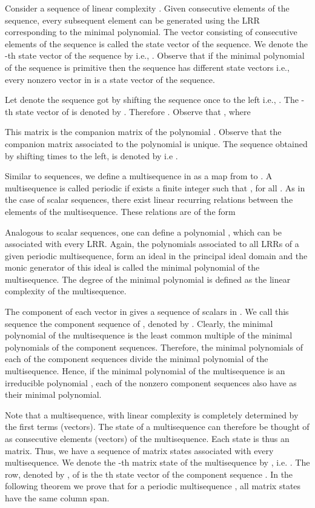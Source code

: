 \documentclass[letterpaper, 12 pt]{article}  \usepackage{amssymb}
\begin{document}
Consider a sequence of linear complexity . Given  consecutive elements of
the sequence, every subsequent element can be generated using the LRR
corresponding to the minimal polynomial. The vector consisting of 
consecutive elements of the sequence is called the state vector of the sequence.
We denote the -th state vector of the sequence by  i.e., . Observe that if the minimal polynomial of the
sequence is primitive then the sequence has  different state
vectors i.e., every nonzero vector in  is a state vector of the
sequence. 

Let  denote the sequence got by shifting the sequence  once
to the left i.e., . The -th state vector of
 is denoted by . Therefore .
Observe that  , where

This matrix is the companion matrix of the polynomial .  Observe that the 
companion matrix associated to the polynomial is unique. The sequence obtained by
shifting  
 times to the left, is denoted by  i.e .

Similar to sequences, we define a multisequence in  as a map from
 to . 
 A multisequence    is called
periodic if exists a finite
integer  such that , for all . As in the case
of scalar sequences, there exist linear  recurring relations between the
elements of the
multisequence. These relations are of the form
{\small

}
 Analogous to scalar sequences, one can define
a polynomial ,
which can be associated with every LRR.
Again, the polynomials associated to all LRRs of a 
given periodic multisequence, form an ideal in the principal ideal domain
 and the monic
generator of this ideal is called the minimal polynomial of the multisequence.
The degree of the minimal polynomial is defined as the linear complexity of the
multisequence.    
      
  The  component of each vector in  gives a sequence of
scalars in . We call this sequence the
 component sequence of , denoted by . Clearly, the
minimal polynomial of the multisequence is the least common multiple of the
minimal polynomials of the component sequences. Therefore, the minimal
polynomials of each of the component sequences divide the minimal polynomial of
the multisequence. Hence, if the minimal polynomial of the multisequence is an
irreducible polynomial , each of the nonzero component sequences also have
 as
their minimal polynomial.



Note that a multisequence, with linear complexity  is completely determined
by the first  terms (vectors).  The state of a multisequence can 
therefore be thought of as  consecutive elements (vectors) of the 
multisequence. Each state is thus an  matrix.
 Thus, we have a sequence of  matrix states associated with every
multisequence. We denote the -th matrix state of the multisequence  by
, i.e. . The
 row, denoted by , of  is the th state
vector of the component sequence . 
In the following theorem
we prove that for a periodic multisequence , all matrix states have
the same column span.
\end{document}
